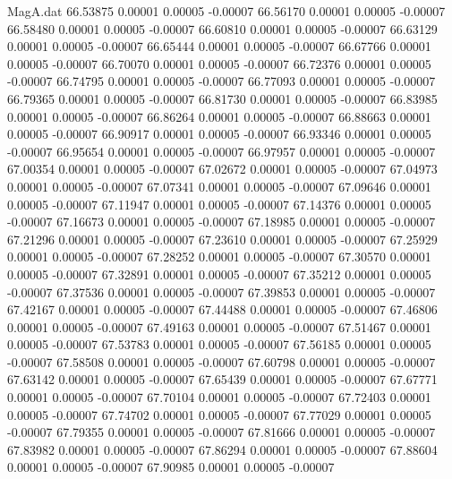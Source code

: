 \begin{filecontents}{MagA.dat}
  66.53875    0.00001    0.00005   -0.00007
  66.56170    0.00001    0.00005   -0.00007
  66.58480    0.00001    0.00005   -0.00007
  66.60810    0.00001    0.00005   -0.00007
  66.63129    0.00001    0.00005   -0.00007
  66.65444    0.00001    0.00005   -0.00007
  66.67766    0.00001    0.00005   -0.00007
  66.70070    0.00001    0.00005   -0.00007
  66.72376    0.00001    0.00005   -0.00007
  66.74795    0.00001    0.00005   -0.00007
  66.77093    0.00001    0.00005   -0.00007
  66.79365    0.00001    0.00005   -0.00007
  66.81730    0.00001    0.00005   -0.00007
  66.83985    0.00001    0.00005   -0.00007
  66.86264    0.00001    0.00005   -0.00007
  66.88663    0.00001    0.00005   -0.00007
  66.90917    0.00001    0.00005   -0.00007
  66.93346    0.00001    0.00005   -0.00007
  66.95654    0.00001    0.00005   -0.00007
  66.97957    0.00001    0.00005   -0.00007
  67.00354    0.00001    0.00005   -0.00007
  67.02672    0.00001    0.00005   -0.00007
  67.04973    0.00001    0.00005   -0.00007
  67.07341    0.00001    0.00005   -0.00007
  67.09646    0.00001    0.00005   -0.00007
  67.11947    0.00001    0.00005   -0.00007
  67.14376    0.00001    0.00005   -0.00007
  67.16673    0.00001    0.00005   -0.00007
  67.18985    0.00001    0.00005   -0.00007
  67.21296    0.00001    0.00005   -0.00007
  67.23610    0.00001    0.00005   -0.00007
  67.25929    0.00001    0.00005   -0.00007
  67.28252    0.00001    0.00005   -0.00007
  67.30570    0.00001    0.00005   -0.00007
  67.32891    0.00001    0.00005   -0.00007
  67.35212    0.00001    0.00005   -0.00007
  67.37536    0.00001    0.00005   -0.00007
  67.39853    0.00001    0.00005   -0.00007
  67.42167    0.00001    0.00005   -0.00007
  67.44488    0.00001    0.00005   -0.00007
  67.46806    0.00001    0.00005   -0.00007
  67.49163    0.00001    0.00005   -0.00007
  67.51467    0.00001    0.00005   -0.00007
  67.53783    0.00001    0.00005   -0.00007
  67.56185    0.00001    0.00005   -0.00007
  67.58508    0.00001    0.00005   -0.00007
  67.60798    0.00001    0.00005   -0.00007
  67.63142    0.00001    0.00005   -0.00007
  67.65439    0.00001    0.00005   -0.00007
  67.67771    0.00001    0.00005   -0.00007
  67.70104    0.00001    0.00005   -0.00007
  67.72403    0.00001    0.00005   -0.00007
  67.74702    0.00001    0.00005   -0.00007
  67.77029    0.00001    0.00005   -0.00007
  67.79355    0.00001    0.00005   -0.00007
  67.81666    0.00001    0.00005   -0.00007
  67.83982    0.00001    0.00005   -0.00007
  67.86294    0.00001    0.00005   -0.00007
  67.88604    0.00001    0.00005   -0.00007
  67.90985    0.00001    0.00005   -0.00007

\end{filecontents}
